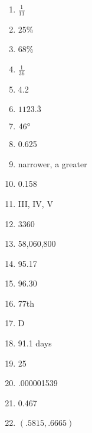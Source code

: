 \documentclass[../uilmath.tex]{subfiles}
\begin{document}
\begin{enumerate}[label=\bfseries\arabic*.]
    \item %
    $\frac{1}{11}$

    \item %
    25\%

    \item %
    68\% 

    \item %
    $\frac{1}{36}$

    \item %
    4.2

    \item %
    $1123.\overline{3}$

    \item %
    $46\degree$

    \item %
    0.625

    \item %
    narrower, a greater 

    \item %
    0.158

    \item %
    III, IV, V 

    \item %
    3360

    \item %
    58,060,800

    \item %
    95.17

    \item %
    96.30

    \item %
    77th

    \item %
    D 

    \item %
    91.1 days 

    \item %
    25

    \item %
    .000001539

    \item %
    0.467 

    \item %
    $(.5815, .6665)$


\end{enumerate}
\end{document}
